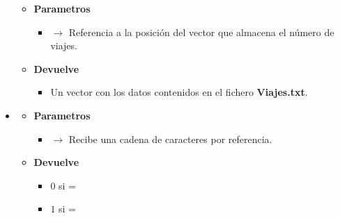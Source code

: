 \begin{itemize}
\begin{itemize}
		\item \textbf{Parametros}
		\begin{itemize}
			\item {} $\rightarrow$ Referencia a la posición del vector que almacena el número de viajes.
		\end{itemize}
		\item \textbf{Devuelve}
		\begin{itemize}
			\item Un vector con los datos contenidos en el fichero \textbf{Viajes.txt}.
		\end{itemize}
	\end{itemize}
	\item\label{def:perfilusuario}
	\begin{itemize}
		\item \textbf{Parametros}
		\begin{itemize}
			\item {} $\rightarrow$ Recibe una cadena de caracteres por referencia.
			
		\end{itemize}
		\item \textbf{Devuelve}
		\begin{itemize}
			\item $0$ si  = 
			\item $1$ si  = 
		\end{itemize}
	\end{itemize}
\end{itemize}
\newpage




